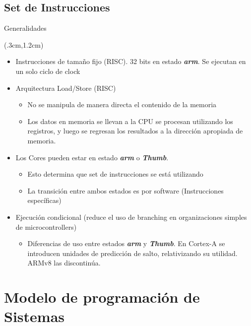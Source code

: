 \documentclass[usenames,table,dvipsnames,aspectratio=169]{beamer}
\newcommand{\arm}{\textbf{\textit{arm}}}
\newcommand{\Thumb}{\textbf{\textit{Thumb}}}
\begin{document}
\subsection{Set de Instrucciones}
\begin{frame}{Generalidades}
 \begin{textblock*}{\textwidth}(.3cm,1.2cm)
  \begin{itemize}[<+(1)->]\justifying \parskip 0.15cm
   \item Instrucciones de tamaño fijo (RISC). 32 bits en estado \arm. Se ejecutan en un solo ciclo de clock
   \item Arquitectura Load/Store (RISC)
   \begin{itemize}
    \item No se manipula de manera directa el contenido de la memoria
    \item Los datos en memoria se llevan a la CPU se procesan utilizando los registros, y luego se regresan los resultados a la dirección apropiada de memoria.
   \end{itemize}
   \item Los Cores pueden estar en estado \arm{} o \Thumb.
   \begin{itemize}
    \item Esto determina que set de instrucciones se está utilizando
    \item La transición entre ambos estados es por software (Instrucciones específicas)
   \end{itemize}
   \item Ejecución condicional (reduce el uso de branching en organizaciones simples de microcontrollers)
   \begin{itemize}
    \item Diferencias de uso entre estados \arm{} y \Thumb. En Cortex-A se introducen unidades de predicción de salto, relativizando su utilidad. ARMv8 las discontinúa.
   \end{itemize}
  \end{itemize}
 \end{textblock*}
\end{frame}

\section{Modelo de programación de Sistemas}
\end{document}
